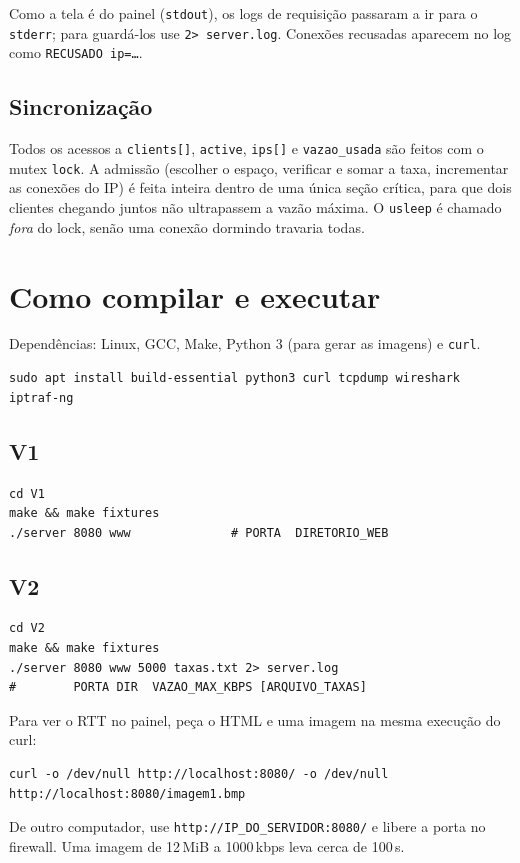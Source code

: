 \documentclass[11pt,a4paper]{article}
\begin{document}
Como a tela é do painel (\texttt{stdout}), os logs de requisição passaram a ir para o
\texttt{stderr}; para guardá-los use \texttt{2> server.log}. Conexões recusadas aparecem no
log como \texttt{RECUSADO ip=\ldots}.

\subsection{Sincronização}
Todos os acessos a \texttt{clients[]}, \texttt{active}, \texttt{ips[]} e
\texttt{vazao\_usada} são feitos com o mutex \texttt{lock}. A admissão (escolher o espaço,
verificar e somar a taxa, incrementar as conexões do IP) é feita inteira dentro de uma única
seção crítica, para que dois clientes chegando juntos não ultrapassem a vazão máxima.
O \texttt{usleep} é chamado \emph{fora} do lock, senão uma conexão dormindo travaria todas.

\section{Como compilar e executar}

Dependências: Linux, GCC, Make, Python 3 (para gerar as imagens) e \texttt{curl}.
\begin{lstlisting}
sudo apt install build-essential python3 curl tcpdump wireshark iptraf-ng
\end{lstlisting}

\subsection*{V1}
\begin{lstlisting}
cd V1
make && make fixtures
./server 8080 www              # PORTA  DIRETORIO_WEB
\end{lstlisting}

\subsection*{V2}
\begin{lstlisting}
cd V2
make && make fixtures
./server 8080 www 5000 taxas.txt 2> server.log
#        PORTA DIR  VAZAO_MAX_KBPS [ARQUIVO_TAXAS]
\end{lstlisting}

Para ver o RTT no painel, peça o HTML e uma imagem na mesma execução do curl:
\begin{lstlisting}
curl -o /dev/null http://localhost:8080/ -o /dev/null http://localhost:8080/imagem1.bmp
\end{lstlisting}
De outro computador, use \texttt{http://IP\_DO\_SERVIDOR:8080/} e libere a porta no
firewall. Uma imagem de 12\,MiB a 1000\,kbps leva cerca de 100\,s.
\end{document}
